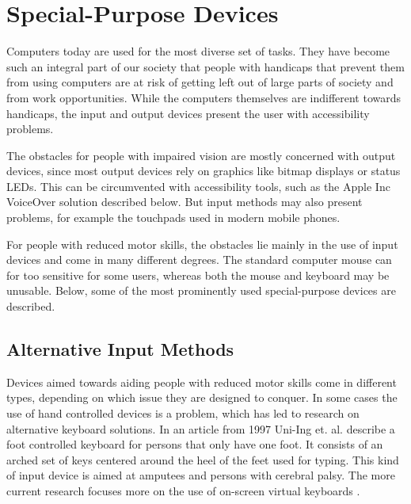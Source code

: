 
\section{Special-Purpose Devices}

Computers today are used for the most diverse set of tasks. They have become such an integral part of our society that people with handicaps that prevent them from using computers are at risk of getting left out of large parts of society and from work opportunities. While the computers themselves are indifferent towards handicaps, the input and output devices present the user with accessibility problems.

The obstacles for people with impaired vision are mostly concerned with output devices, since most output devices rely on graphics like bitmap displays or status LEDs. This can be circumvented with accessibility tools, such as the Apple Inc VoiceOver solution described below. But input methods may also present problems, for example the touchpads used in modern mobile phones.

For people with reduced motor skills, the obstacles lie mainly in the use of input devices and come in many different degrees. The standard computer mouse  can for too sensitive for some users, whereas both the mouse and keyboard may be unusable. Below, some of the most prominently used special-purpose devices are described.


\subsection{Alternative Input Methods}
Devices aimed towards aiding people with reduced motor skills come in different types, depending on which issue they are designed to conquer. In some cases the use of hand controlled devices is a problem, which has led to research on alternative keyboard solutions. In an article from 1997 Uni-Ing et. al. \cite{583209} describe a foot controlled keyboard for persons that only have one foot. It consists of an arched set of keys centered around the heel of the feet used for typing. This kind of input device is aimed at amputees and persons with cerebral palsy. The more current research focuses more on the use of on-screen virtual keyboards \cite{6141407}\cite{conf/assets/WandmacherAP07}.

